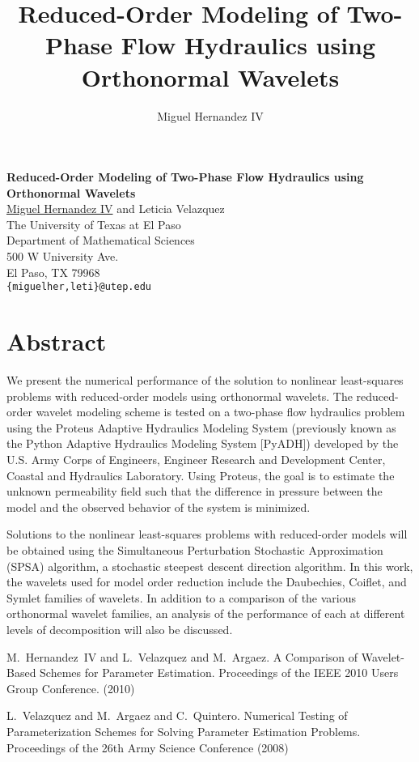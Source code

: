 \title{Reduced-Order Modeling of Two-Phase Flow Hydraulics using Orthonormal Wavelets}
\author{Miguel Hernandez IV} 

\begin{center}

\textbf{\Large Reduced-Order Modeling of Two-Phase Flow Hydraulics using Orthonormal Wavelets}\\
\vspace{10mm}
{\large \underline{Miguel Hernandez IV} and Leticia Velazquez}\\
The University of Texas at El Paso\\Department of Mathematical Sciences\\500 W University Ave.\\El Paso, TX 79968\\
{\tt \{miguelher,leti\}@utep.edu}\\
\end{center}

\section*{Abstract}

We present the numerical performance of the solution to nonlinear least-squares problems with reduced-order models using orthonormal wavelets.  The reduced-order wavelet modeling scheme is tested on a two-phase flow hydraulics problem using the Proteus Adaptive Hydraulics Modeling System (previously known as the Python Adaptive Hydraulics Modeling System [PyADH]) developed by the U.S. Army Corps of Engineers, Engineer Research and Development Center, Coastal and Hydraulics Laboratory.  Using Proteus, the goal is to estimate the unknown permeability field such that the difference in pressure between the model and the observed behavior of the system is minimized.

Solutions to the nonlinear least-squares problems with reduced-order models will be obtained using the Simultaneous Perturbation Stochastic Approximation (SPSA) algorithm, a stochastic steepest descent direction algorithm.  In this work, the wavelets used for model order reduction include the Daubechies, Coiflet, and Symlet families of wavelets.  In addition to a comparison of the various orthonormal wavelet families, an analysis of the performance of each at different levels of decomposition will also be discussed.


\begin{thebibliography}{10}

{\sc M.~Hernandez~IV and L.~Velazquez and M.~Argaez}. {A Comparison of Wavelet-Based Schemes for Parameter Estimation}. Proceedings of the IEEE 2010 Users Group Conference. (2010)

{\sc L.~Velazquez and M.~Argaez and C.~Quintero}. {Numerical Testing of Parameterization Schemes for Solving Parameter Estimation Problems.} Proceedings of the 26th Army Science Conference (2008)

\end{thebibliography}